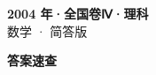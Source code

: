 \documentclass[zihao=-4, a4paper]{ctexart}
\begin{document}
\begin{center}
  {\Large\bfseries 2004 年·全国卷Ⅳ·理科}\\[4pt]
  {\large 数学 · 简答版}
\end{center}
\medskip
{}

\clearpage
{}
\begin{center}{\Large\bfseries 答案速查}\end{center}
\medskip

\end{document}
